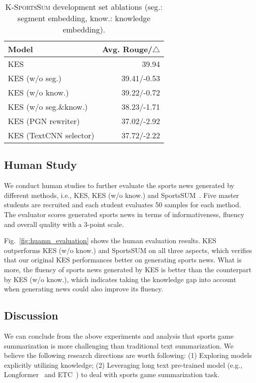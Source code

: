 \begin{table}[t]
  \centering
  \resizebox{0.30\textwidth}{!}
  {
    \centering
    \begin{tabular}{lr}
        \hline
        Model                  & Avg. Rouge/$\triangle$ \\ \hline
        KES                    & 39.94      \\ \hline
        KES (w/o seg.)         & 39.41/-0.53      \\
        KES (w/o know.)        & 39.22/-0.72      \\
        KES (w/o seg.\&know.)  & 38.23/-1.71      \\
        KES (PGN rewriter)     & 37.02/-2.92      \\
        KES (TextCNN selector) & 37.72/-2.22      \\ \hline
        \end{tabular}
  }
  \caption{\textsc{K-SportsSum} development set ablations (seg.: segment embedding, know.: knowledge embedding).}
  \label{table:ablations}
\end{table}

\subsection{Human Study}
We conduct human studies to further evaluate the sports news generated by different methods, i.e., KES, KES (w/o know.) and SportsSUM~\cite{Huang2020GeneratingSN}. Five master students are recruited and each student evaluates 50 samples for each method.
The evaluator scores generated sports news in terms of informativeness, fluency and overall quality with a 3-point scale.

Fig.~\ref{fig:huamn_evaluation} shows the human evaluation results. KES outperforms KES (w/o know.) and SportsSUM on all three aspects, which verifies that our original KES performances better on generating sports news. What is more, the fluency of sports news generated by KES is better than the counterpart by KES (w/o know.), which indicates taking the knowledge gap into account when generating news could also improve its fluency.

\subsection{Discussion}
We can conclude from the above experiments and analysis that sports game summarization is more challenging than traditional text summarization.
We believe the following research directions are worth following:
(1) Exploring models explicitly utilizing knowledge;
(2) Leveraging long text pre-trained model (e.g., Longformer~\cite{Beltagy2020LongformerTL} and ETC~\cite{Ainslie2020ETCEL}) to deal with sports game summarization task.

